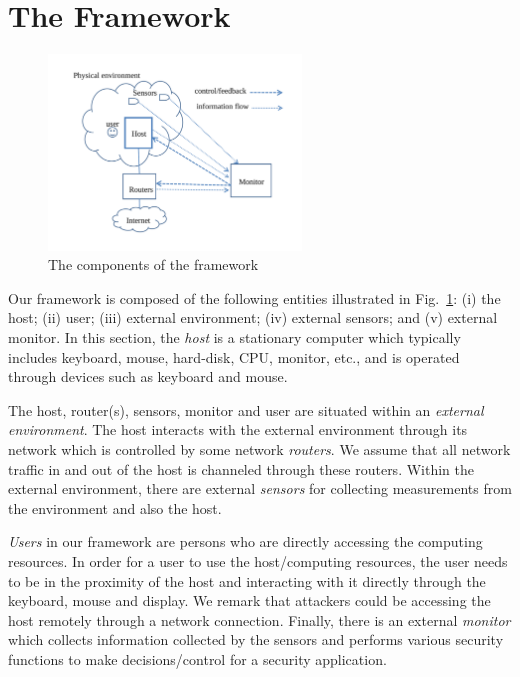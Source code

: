 \section{The Framework}
\label{sec:sensor-framework}

\begin{figure}[htb]
\centering
\includegraphics[width=0.6\textwidth]{sensor/components}
\caption{The components of the framework} \label{fig:components}
\end{figure}

Our framework is composed of the following
entities illustrated in Fig.~\ref{fig:components}:
(i) the host;
(ii) user;
(iii) external environment;
(iv) external sensors;
and (v) external monitor.
In this section, the {\em host} is a stationary computer which typically includes
keyboard, mouse, hard-disk, CPU, monitor, etc., and is operated through 
devices such as keyboard and mouse.

The host, router(s), sensors, monitor and user are situated within
an {\em external environment}.
The host interacts with the external environment through its network
which is controlled by some network {\em routers}.
We assume that all network traffic in and out of the host is
channeled through these routers.
Within the external environment, there are external {\em sensors} for
collecting measurements from the environment and also the host.

{\em Users} in our framework are persons who are
directly accessing the computing resources.
In order for a user to use the host/computing resources, the user
needs to be in the proximity of the host and interacting with it directly
through the keyboard, mouse and display.
We remark that attackers could be accessing the host remotely through
a network connection.
Finally, there is an external {\em monitor} which collects information
collected by the sensors and performs various security functions to
make decisions/control for a security application.

